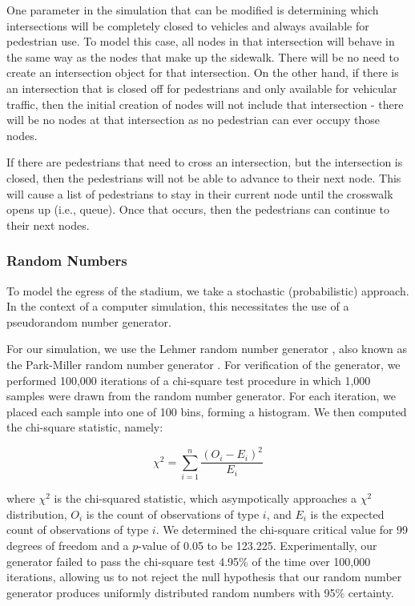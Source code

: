 \documentclass[12pt]{article}
\begin{document}
One parameter in the simulation that can be modified is determining which
intersections will be completely closed to vehicles and always available for
pedestrian use. To model this case, all nodes in that intersection will behave
in the same way as the nodes that make up the sidewalk. There will be no need to
create an intersection object for that intersection. On the other hand, if there
is an intersection that is closed off for pedestrians and only available for
vehicular traffic, then the initial creation of nodes will not include that
intersection - there will be no nodes at that intersection as no pedestrian can
ever occupy those nodes.

If there are pedestrians that need to cross an intersection, but the
intersection is closed, then the pedestrians will not be able to advance to
their next node. This will cause a list of pedestrians to stay in their
current node until the crosswalk opens up (i.e., queue). Once that occurs, then
the pedestrians can continue to their next nodes.

\subsubsection{Random Numbers}
To model the egress of the stadium, we take a stochastic (probabilistic)
approach. In the context of a computer simulation, this necessitates the use of
a pseudorandom number generator.

For our simulation, we use the Lehmer random number generator
\cite{payne1969coding}, also known as the Park-Miller random number generator
\cite{park1988random}. For verification of the generator, we performed
100,000 iterations of a chi-square test procedure in which 1,000 samples were
drawn from the random number generator. For each iteration, we placed each
sample into one of 100 bins, forming a histogram. We then computed the
chi-square statistic, namely:

\begin{equation}
{\chi}^2=\sum_{i=1}^{n} \frac{(O_i - E_i)^2}{E_i}
\end{equation}

where ${\chi}^2$ is the chi-squared statistic, which asympotically approaches
a ${\chi}^2$ distribution, $O_i$ is the count of observations of type $i$,
and $E_i$ is the expected count of observations of type $i$. We determined the
chi-square critical value for 99 degrees of freedom and a $p$-value of 0.05 to be
123.225. Experimentally, our generator failed to pass the chi-square test 4.95\%
of the time over 100,000 iterations, allowing us to not reject the null
hypothesis that our random number generator produces uniformly distributed
random numbers with 95\% certainty.
\end{document}
